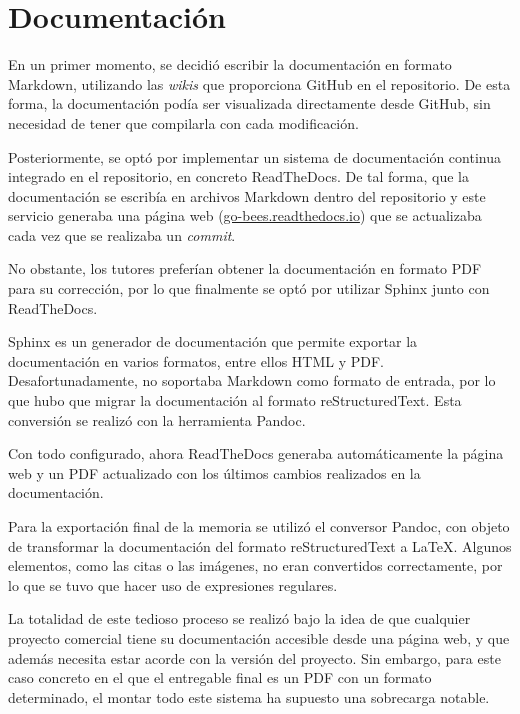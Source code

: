 \section{Documentación}\label{aspectos-documentacion}

En un primer momento, se decidió escribir la documentación en formato
Markdown, utilizando las \emph{wikis} que proporciona GitHub en el
repositorio. De esta forma, la documentación podía ser visualizada
directamente desde GitHub, sin necesidad de tener que compilarla con
cada modificación.

Posteriormente, se optó por implementar un sistema de documentación
continua integrado en el repositorio, en concreto ReadTheDocs. De tal
forma, que la documentación se escribía en archivos Markdown dentro del
repositorio y este servicio generaba una página web
(\href{http://go-bees.readthedocs.io/}{go-bees.readthedocs.io}) que se
actualizaba cada vez que se realizaba un \emph{commit}.

No obstante, los tutores preferían obtener la documentación en formato
PDF para su corrección, por lo que finalmente se optó por utilizar
Sphinx junto con ReadTheDocs.

Sphinx es un generador de documentación que permite exportar la
documentación en varios formatos, entre ellos HTML y PDF.
Desafortunadamente, no soportaba Markdown como formato de entrada, por
lo que hubo que migrar la documentación al formato reStructuredText.
Esta conversión se realizó con la herramienta Pandoc.

Con todo configurado, ahora ReadTheDocs generaba automáticamente la
página web y un PDF actualizado con los últimos cambios realizados en la
documentación.


Para la exportación final de la memoria se utilizó el conversor Pandoc,
con objeto de transformar la documentación del formato reStructuredText
a \LaTeX. Algunos elementos, como las citas o las imágenes, no eran
convertidos correctamente, por lo que se tuvo que hacer uso de
expresiones regulares.

La totalidad de este tedioso proceso se realizó bajo la idea de que
cualquier proyecto comercial tiene su documentación accesible desde una
página web, y que además necesita estar acorde con la versión del
proyecto. Sin embargo, para este caso concreto en el que el entregable
final es un PDF con un formato determinado, el montar todo este sistema
ha supuesto una sobrecarga notable.

